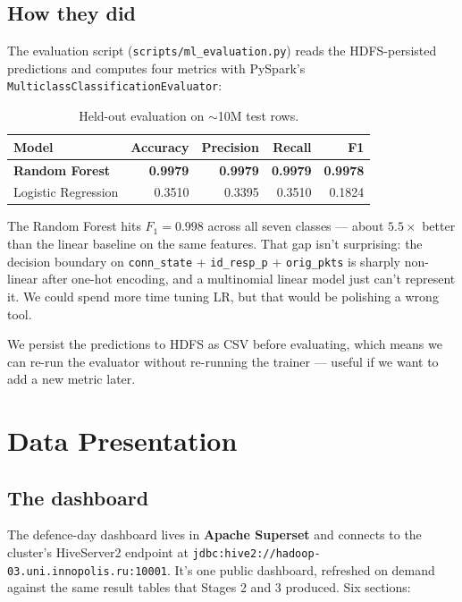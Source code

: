 \documentclass[11pt,a4paper]{article}
\begin{document}
\subsection{How they did}

The evaluation script (\texttt{scripts/ml\_evaluation.py}) reads the
HDFS-persisted predictions and computes four metrics with PySpark's
\texttt{MulticlassClassificationEvaluator}:

\begin{table}[H]
\centering
\small
\begin{tabular}{lrrrr}
\toprule
\textbf{Model} & \textbf{Accuracy} & \textbf{Precision} & \textbf{Recall} & \textbf{F1} \\
\midrule
\textbf{Random Forest}     & \textbf{0.9979} & \textbf{0.9979} & \textbf{0.9979} & \textbf{0.9978} \\
Logistic Regression        & 0.3510 & 0.3395 & 0.3510 & 0.1824 \\
\bottomrule
\end{tabular}
\caption{Held-out evaluation on $\sim$10M test rows.}
\end{table}

The Random Forest hits $F_1 = 0.998$ across all seven classes --- about
$5.5\times$ better than the linear baseline on the same features. That
gap isn't surprising: the decision boundary on
\texttt{conn\_state} + \texttt{id\_resp\_p} + \texttt{orig\_pkts} is
sharply non-linear after one-hot encoding, and a multinomial linear model
just can't represent it. We could spend more time tuning LR, but that
would be polishing a wrong tool.

We persist the predictions to HDFS as CSV before evaluating, which means
we can re-run the evaluator without re-running the trainer --- useful if
we want to add a new metric later.

\section{Data Presentation}

\subsection{The dashboard}

The defence-day dashboard lives in \textbf{Apache Superset} and connects
to the cluster's HiveServer2 endpoint at
\texttt{jdbc:hive2://hadoop-03.uni.innopolis.ru:10001}. It's one public
dashboard, refreshed on demand against the same result tables that
Stages 2 and 3 produced. Six sections:
\end{document}
